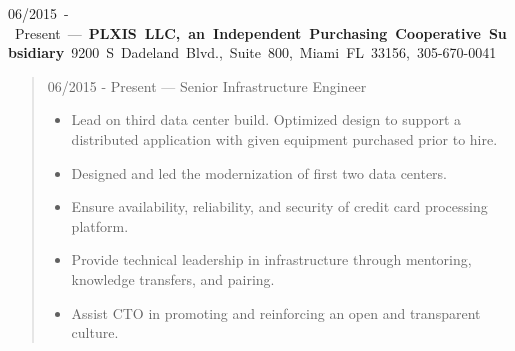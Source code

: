 \mbox{06/2015 - Present --- {\bf PLXIS LLC, an Independent Purchasing Cooperative Subsidiary} 9200 S Dadeland Blvd., Suite 800, Miami FL 33156, 305-670-0041}
\begin{quote}
06/2015 - Present --- Senior Infrastructure Engineer\\
\begin{itemize}
\item Lead on third data center build.  Optimized design to support a distributed application with given equipment purchased prior to hire.
\item Designed and led the modernization of first two data centers.
\item Ensure availability, reliability, and security of credit card processing platform.
\item Provide technical leadership in infrastructure through mentoring, knowledge transfers, and pairing.
\item Assist CTO in promoting and reinforcing an open and transparent culture.
\end{itemize}
\end{quote}
